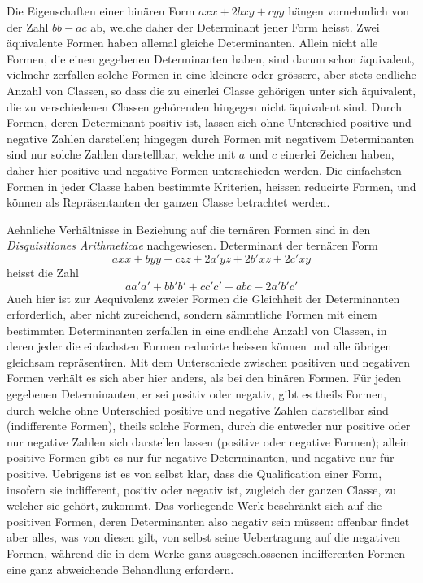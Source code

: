 Die Eigenschaften einer binären Form $axx+2bxy+cyy$ hängen vornehmlich von der Zahl $bb-ac$ ab, welche daher der Determinant jener Form heisst. Zwei äquivalente Formen haben allemal gleiche Determinanten. Allein nicht alle Formen, die einen gegebenen Determinanten haben, sind darum schon äquivalent, vielmehr zerfallen solche Formen in eine kleinere oder grössere, aber stets endliche Anzahl von Classen, so dass die zu einerlei Classe gehörigen unter sich äquivalent, die zu verschiedenen Classen gehörenden hingegen nicht äquivalent sind. Durch Formen, deren Determinant positiv ist, lassen sich ohne Unterschied positive und negative Zahlen darstellen; hingegen durch Formen mit negativem Determinanten sind nur solche Zahlen darstellbar, welche mit $a$ und $c$ einerlei Zeichen haben, daher hier positive und negative Formen unterschieden werden. Die einfachsten Formen in jeder Classe haben bestimmte Kriterien, heissen reducirte Formen, und können als Repräsentanten der ganzen Classe betrachtet werden.

Aehnliche Verhältnisse in Beziehung auf die ternären Formen sind in den \emph{Disquisitiones Arithmeticae} nachgewiesen. Determinant der ternären Form
\[
axx+byy+czz+2a'yz+2b'xz+2c'xy
\]
heisst die Zahl
\[
aa'a'+bb'b'+cc'c'-abc-2a'b'c'
\]
Auch hier ist zur Aequivalenz zweier Formen die Gleichheit der Determinanten erforderlich, aber nicht zureichend, sondern sämmtliche Formen mit einem bestimmten Determinanten zerfallen in eine endliche Anzahl von Classen, in deren jeder die einfachsten Formen reducirte heissen können und alle übrigen gleichsam repräsentiren. Mit dem Unterschiede zwischen positiven und negativen Formen verhält es sich aber hier anders, als bei den binären Formen. Für jeden gegebenen Determinanten, er sei positiv oder negativ, gibt es theils Formen, durch welche
ohne Unterschied positive und negative Zahlen darstellbar sind (indifferente Formen), theils solche Formen, durch die entweder nur positive oder nur negative Zahlen sich darstellen lassen (positive oder negative Formen); allein positive Formen gibt es nur für negative Determinanten, und negative nur für positive. Uebrigens ist es von selbst klar, dass die Qualification einer Form, insofern sie indifferent, positiv oder negativ ist, zugleich der ganzen Classe, zu welcher sie gehört, zukommt. Das vorliegende Werk beschränkt sich auf die positiven Formen, deren Determinanten also negativ sein müssen: offenbar findet aber alles, was von diesen gilt, von selbst seine Uebertragung auf die negativen Formen, während die in dem Werke ganz ausgeschlossenen indifferenten Formen eine ganz abweichende Behandlung erfordern.

